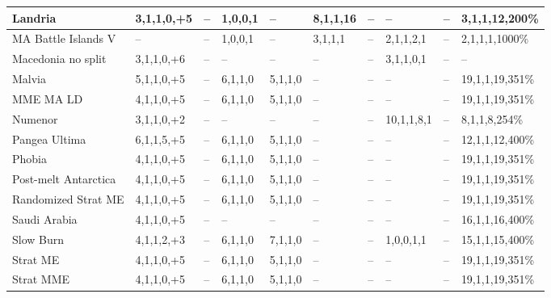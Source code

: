 \begin{longtable}{|p{1.8cm}|p{1cm}|p{0.8cm}|p{1cm}|p{1cm}|p{1cm}|p{1cm}|p{1.3cm}|p{1cm}|p{1.4cm}|}
Landria                   & 3,1,1,0,+5  & –                    & 1,0,0,1   & –         & 8,1,1,16 & – & –            & –   & 3,1,1,12,200\% \\ \hline
MA Battle Islands V       & –           & –                    & 1,0,0,1   & –         & 3,1,1,1 & – & 2,1,1,2,1      & –   & 2,1,1,1,1000\% \\ \hline
Macedonia no split        & 3,1,1,0,+6  & –                    & –         & –         & –   & –   & 3,1,1,0,1       & –   & – \\ \hline
Malvia                    & 5,1,1,0,+5  & –                    & 6,1,1,0   & 5,1,1,0   & –   & –   & –               & –   & 19,1,1,19,351\% \\ \hline
MME MA LD                 & 4,1,1,0,+5  & –                    & 6,1,1,0   & 5,1,1,0   & –   & –   & –               & –   & 19,1,1,19,351\% \\ \hline
Numenor                   & 3,1,1,0,+2  & –                    & –         & –         & –   & –   & 10,1,1,8,1      & –   & 8,1,1,8,254\% \\ \hline
Pangea Ultima             & 6,1,1,5,+5  & –                    & 6,1,1,0   & 5,1,1,0   & –   & –   & –               & –   & 12,1,1,12,400\% \\ \hline
Phobia                    & 4,1,1,0,+5  & –                    & 6,1,1,0   & 5,1,1,0   & –   & –   & –               & –   & 19,1,1,19,351\% \\ \hline
Post-melt Antarctica      & 4,1,1,0,+5  & –                    & 6,1,1,0   & 5,1,1,0   & –   & –   & –               & –   & 19,1,1,19,351\% \\ \hline
Randomized Strat ME       & 4,1,1,0,+5  & –                    & 6,1,1,0   & 5,1,1,0   & –   & –   & –               & –   & 19,1,1,19,351\% \\ \hline
Saudi Arabia              & 4,1,1,0,+5  & –                    & –         & –         & –   & –   & –               & –   & 16,1,1,16,400\% \\ \hline
Slow Burn                 & 4,1,1,2,+3  & –                    & 6,1,1,0   & 7,1,1,0   & –   & –   & 1,0,0,1,1       & –   & 15,1,1,15,400\% \\ \hline
Strat ME                  & 4,1,1,0,+5  & –                    & 6,1,1,0   & 5,1,1,0   & –   & –   & –               & –   & 19,1,1,19,351\% \\ \hline
Strat MME                 & 4,1,1,0,+5  & –                    & 6,1,1,0   & 5,1,1,0   & –   & –   & –               & –   & 19,1,1,19,351\% \\ \hline

\end{longtable}
